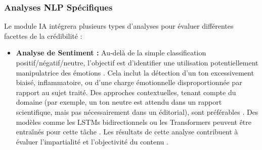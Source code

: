 \documentclass[9pt,twocolumn,french]{article}
\begin{document}
\subsubsection{Analyses NLP Spécifiques}
Le module IA intégrera plusieurs types d'analyses pour évaluer différentes facettes de la crédibilité :

\begin{itemize}
    \item \textbf{Analyse de Sentiment :} Au-delà de la simple classification positif/négatif/neutre, l'objectif est d'identifier une utilisation potentiellement manipulatrice des émotions \citep{Ahmed2025Aidriven, Sharma2021Combating, Li2021Debunking, Giachanou2018Like, Castillo2011}. Cela inclut la détection d'un ton excessivement biaisé, inflammatoire, ou d'une charge émotionnelle disproportionnée par rapport au sujet traité. Des approches contextuelles, tenant compte du domaine (par exemple, un ton neutre est attendu dans un rapport scientifique, mais pas nécessairement dans un éditorial), sont préférables \citep{Ahmed2025Aidriven}. Des modèles comme les LSTMs bidirectionnels ou les Transformers peuvent être entraînés pour cette tâche \citep{Ahmed2025Aidriven, Li2021Debunking}. Les résultats de cette analyse contribuent à évaluer l'impartialité et l'objectivité du contenu \citep{Rieh2014Credibility}.


\end{itemize}
\end{document}
